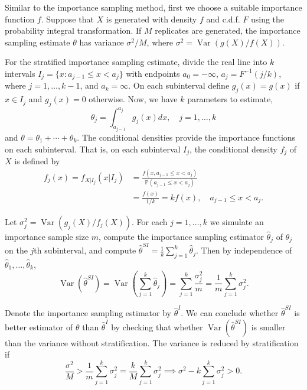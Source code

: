 \documentclass[11pt]{article}
\begin{document}
Similar to the importance sampling method, first we choose a suitable importance function $f$. Suppose that $X$ is generated with density $f$ and c.d.f. $F$ using the probability integral transformation. If $M$ replicates are generated, the importance sampling estimate $\theta$ has variance $\sigma^2/M$, where $\sigma^2=\operatorname{Var}\left(g(X)/f(X)\right)$.

For the stratified importance sampling estimate, divide the real line into $k$ intervals $I_j=\{x:a_{j-1}\leq x <a_j\}$ with endpoints $a_0=-\infty$, $a_j=F^{-1}(j/k)$, where $j=1,\ldots,k-1$, and $a_k=\infty$. On each subinterval define $g_j(x)=g(x)$ if $x\in I_j$ and $g_j(x)=0$ otherwise. Now, we have $k$ parameters to estimate,
\[
\theta_j=\int_{a_{j-1}}^{a_j} g_j(x)dx,\quad j=1,\ldots,k
\]
and $\theta=\theta_1+\cdots+\theta_k$. The conditional densities provide the importance functions on each subinterval. That is, on each subinterval $I_j$, the conditional density $f_j$ of $X$ is defined by
\begin{align*}
f_j(x)=f_{X|I_j}(x|I_j) &=\frac{f(x,a_{j-1}\leq x<a_j)}{\mathbb{P}(a_{j-1}\leq x<a_j)}\\
&=\frac{f(x)}{1/k}=kf(x),\quad a_{j-1}\leq x<a_j.
\end{align*}

Let $\sigma_j^2=\operatorname{Var}\left(g_j(X)/f_j(X)\right)$. For each $j= 1,\ldots,k$ we simulate an importance sample size $m$, compute the importance sampling estimator $\widehat{\theta}_{j}$ of $\theta_j$ on the $j$th subinterval, and compute $\widehat{\theta}^{SI}=\frac{1}{k}\sum_{j=1}^k\widehat{\theta}_{j}$. Then by independence of $\widehat{\theta}_{1},\ldots,\widehat{\theta}_{k}$,
\[
\operatorname{Var}\left(\widehat{\theta}^{SI}\right)=\operatorname{Var}\left(\sum_{j=1}^k\widehat{\theta}_{j}\right)=\sum_{j=1}^k\frac{\sigma_j^2}{m}=\frac{1}{m}\sum_{j=1}^k\sigma_j^2.
\]

Denote the importance sampling estimator by $\widehat{\theta}^{I}$. We can conclude whether $\widehat{\theta}^{SI}$ is better estimator of $\theta$ than $\widehat{\theta}^{I}$ by checking that whether $\operatorname{Var}\left(\widehat{\theta}^{SI}\right)$ is smaller than the variance without stratification. The variance is reduced by stratification if 
\[
\frac{\sigma^2}{M}>\frac{1}{m}\sum_{j=1}^k\sigma_j^2=\frac{k}{M}\sum_{j=1}^k\sigma_j^2 \implies \sigma^2-k\sum_{j=1}^k\sigma_j^2>0.
\]
\end{document}
